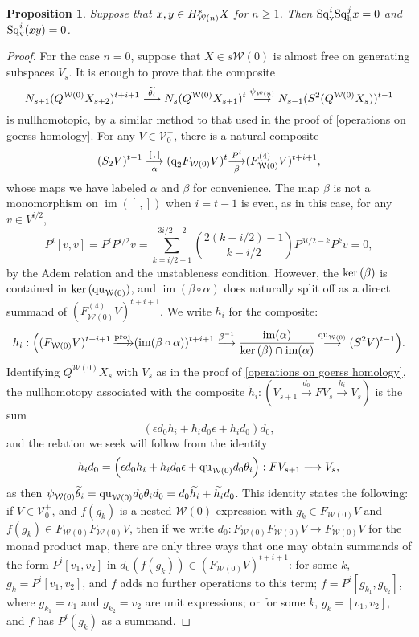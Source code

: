 \documentclass[11pt]{amsart}
\theoremstyle{plain}
\newtheorem{prop}[thm]{Proposition}
\theoremstyle{definition}
\renewcommand{\ker}{\textup{ker}\,}
\DeclareMathOperator{\im}{im}
\renewcommand{\to}{\longrightarrow}
\newcommand{\calV}{\mathcal{V}}
\newcommand{\calw}{\mathcal{W}}
\theoremstyle{plain}
\newcommand{\vect}[2]{\calV^{#1}_{#2}}
\newcommand{\quadratic}{\textup{qu}}
\newcommand{\quadgrad}[1]{\textup{q}_{#1}}
\newcommand{\epi}{{\,\makebox[0cm][l]{\ensuremath\to}\to}}
\newcommand{\mono}{{\to}}
\newcommand{\Sqh}{\mathrm{Sq}_\textup{h}}
\newcommand{\Sqv}{\mathrm{Sq}_\textup{v}}
\newcommand{\deltav}{\delta^\textup{v}}
\begin{document}
\begin{Cohomology Operations for W and U}
\begin{prop}
Suppose that $x,y\in H^*_{\smash{\calw(n)}}X$ for $n\geq1$. Then $\Sqv^{i}\Sqh^{j}x=0$ and $\Sqv^i(xy)=0$.
\end{prop}
\begin{proof}
For the case $n=0$, suppose that $X\in s\calw(0)$ is almost free on generating subspaces $V_s$. It is enough to prove that the composite
\[N_{s+1}(Q^{\calw(0)}X_{s+2})^{t+i+1}
\overset{\smash{\widetilde{\theta_i}}}{\to}
N_s(Q^{\calw(0)}X_{s+1})^{t}
\overset{{\psi_{\calw(n)}}}{\to}
N_{s-1}(S^2(Q^{\calw(0)}X_{s}))^{t-1}
\]
is nullhomotopic, by a similar method to that used in the proof of \ref{operations on goerss homology}. For any $V\in \vect{+}{0}$, there is a natural composite
\[(S_2V)^{t-1}\underset{\smash{\alpha}}{\overset{[\,,\,]}{\to}} (\quadgrad{2}F_{\calw(0)}V)^{t}\underset{\smash{\beta}}{\overset{P^i}{\mono}} (F^{(4)}_{\calw(0)}V)^{t+i+1},\]
whose maps we have labeled $\alpha$ and $\beta$ for convenience.
The map $\beta$ is not a monomorphism on $\im([\,,])$ when $i=t-1$ is even, as in this case, for any $v\in V^{i/2}$,
\[P^i[v,v]=P^{i}P^{i/2}v=\textstyle\sum_{k=i/2+1}^{3i/2-2}{2(k-i/2)-1\choose k-i/2}P^{3i/2-k}P^kv=0,\]
by the Adem relation and the unstableness condition. However, the $\ker(\beta)$ is contained in $\ker(\quadratic_{\calw(0)})$, 
and $\im(\beta\circ\alpha)$ does naturally split off as a direct summand of $(F^{(4)}_{\calw(0)}V)^{t+i+1}$.
 We write $h_i$ for the composite:
\[h_{i}:\Bigl((F_{\calw(0)}V)^{t+i+1}\overset{\textup{proj}}{\epi}
(\im(\beta\circ\alpha))^{t+i+1}\overset{\beta^{-1}}{\to}\frac{\im(\alpha)}{\ker(\beta)\cap\im(\alpha)}\overset{\quadratic_{\calw(0)}}{\to}(S^2V)^{t-1}\Bigr).\]
Identifying $Q^{\calw(0)}X_s$ with $V_s$ as in the proof of \ref{operations on goerss homology}, the nullhomotopy associated with the composite $\widetilde{h_i}:(V_{s+1}\overset{d_0}{\to}FV_s\overset{h_i}{\to}V_s)$ is the sum
\[(\epsilon d_0h_i+h_id_0\epsilon+h_id_0)d_0,\]
and the relation we seek will follow from the identity
\[h_id_0=\Bigl(\epsilon d_0h_i+h_id_0\epsilon+\quadratic_{\calw(0)} d_0\theta_i\Bigr):FV_{s+1}\to V_s,\]
as then $\psi_{\calw(0)}\smash{\widetilde{\theta}_i}=\quadratic_{\calw(0)} d_0\theta_id_0=d_0\widetilde{h_i}+\widetilde{h_i}d_0$. This identity states the following: if $V\in\vect{+}{0}$, and $f(g_k)$ is a nested $\calw(0)$-expression with $g_k\in F_{\calw(0)}V$ and $f(g_k)\in F_{\calw(0)}F_{\calw(0)}V$, then if we write $d_0:F_{\calw(0)}F_{\calw(0)}V\to F_{\calw(0)}V$ for the monad product map, there are only three ways that one may obtain summands of the form $P^i[v_1,v_2]$ in $d_0(f(g_k))\in (F_{\calw(0)}V)^{t+i+1}$: for some $k$, $g_k=P^i[v_1,v_2]$, and $f $ adds no further operations to this term; $f=P^i[g_{k_1},g_{k_2}]$, where $g_{k_1}=v_1$ and $g_{k_2}=v_2$ are unit expressions; or for some $k$, $g_k=[v_1,v_2]$, and  $f$ has $P^i(g_k)$ as a summand.


\end{proof}
\end{Cohomology Operations for W and U}
\end{document}
